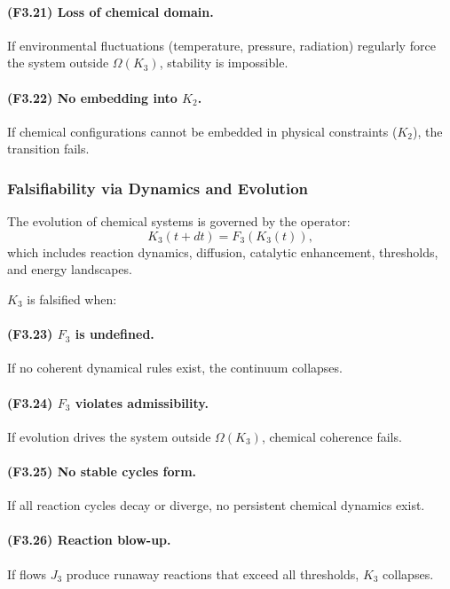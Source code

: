 \paragraph{(F3.21) Loss of chemical domain.}
If environmental fluctuations (temperature, pressure, radiation)
regularly force the system outside $\Omega(K_3)$, stability is
impossible.

\paragraph{(F3.22) No embedding into \texorpdfstring{$K_2$}{K_2}.}
If chemical configurations cannot be embedded in physical constraints
($K_2$), the transition fails.



\subsubsection{Falsifiability via Dynamics and Evolution}

The evolution of chemical systems is governed by the operator:
\[
K_3(t+dt) = F_3(K_3(t)),
\]
which includes reaction dynamics, diffusion, catalytic enhancement,
thresholds, and energy landscapes.

$K_3$ is falsified when:

\paragraph{(F3.23) \texorpdfstring{$F_3$}{F_3} is undefined.}
If no coherent dynamical rules exist, the continuum collapses.

\paragraph{(F3.24) \texorpdfstring{$F_3$}{F_3} violates admissibility.}
If evolution drives the system outside $\Omega(K_3)$, chemical coherence
fails.

\paragraph{(F3.25) No stable cycles form.}
If all reaction cycles decay or diverge, no persistent chemical dynamics
exist.

\paragraph{(F3.26) Reaction blow-up.}
If flows $J_3$ produce runaway reactions that exceed all thresholds,
$K_3$ collapses.

